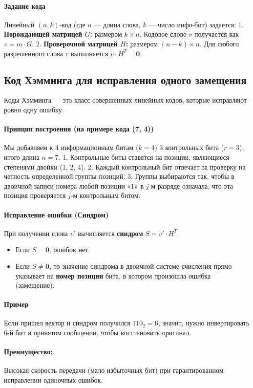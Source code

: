 \paragraph{Задание кода}
Линейный $(n, k)$-код (где $n$ — длина слова, $k$ — число инфо-бит) задается:
1. \textbf{Порождающей матрицей $G$:} размером $k \times n$. Кодовое слово $v$ получается как $v = m \cdot G$.
2. \textbf{Проверочной матрицей $H$:} размером $(n-k) \times n$. Для любого разрешенного слова $v$ выполняется $v \cdot H^T = \mathbf{0}$.

\subsection*{Код Хэмминга для исправления одного замещения}

Коды Хэмминга — это класс совершенных линейных кодов, которые исправляют ровно одну ошибку.

\paragraph{Принцип построения (на примере кода (7, 4))}
Мы добавляем к 4 информационным битам ($k=4$) 3 контрольных бита ($r=3$), итого длина $n=7$.
1. Контрольные биты ставятся на позиции, являющиеся степенями двойки (1, 2, 4).
2. Каждый контрольный бит отвечает за проверку на четность определенной группы позиций.
3. Группы выбираются так, чтобы в двоичной записи номера любой позиции «1» в $j$-м разряде означала, что эта позиция проверяется $j$-м контрольным битом.

\paragraph{Исправление ошибки (Синдром)}
При получении слова $v'$ вычисляется \textbf{синдром} $S = v' \cdot H^T$.
\begin{itemize}
    \item Если $S = \mathbf{0}$, ошибок нет.
    \item Если $S \neq \mathbf{0}$, то значение синдрома в двоичной системе счисления прямо указывает на \textbf{номер позиции} бита, в котором произошла ошибка (замещение).
\end{itemize}

\paragraph{Пример}
Если пришел вектор и синдром получился $110_2 = 6$, значит, нужно инвертировать 6-й бит в принятом сообщении, чтобы восстановить оригинал.

\paragraph{Преимущество:} Высокая скорость передачи (мало избыточных бит) при гарантированном исправлении одиночных ошибок.